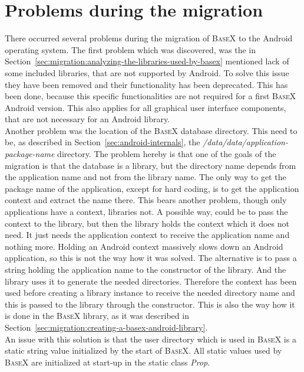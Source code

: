 \section{Problems during the migration}
\label{sec:migration:problems-during-the-migration}
There occurred several problems during the migration of \textsc{BaseX} to the Android operating system.
The first problem which was discovered, was the in Section~\ref{sec:migration:analyzing-the-libraries-used-by-basex} mentioned lack of some included libraries, that are not supported by Android.
To solve this issue they have been removed and their functionality has been deprecated.
This has been done, because this specific functionalities are not required for a first \textsc{BaseX} Android version.
This also applies for all graphical user interface components, that are not necessary for an Android library.\\
Another problem was the location of the \textsc{BaseX} database directory.
This need to be, as described in Section~\ref{sec:android-internals}, the \textit{/data/data/application-package-name} directory.
The problem hereby is that one of the goals of the migration is that the database is a library, but the directory name depends from the application name and not from the library name.
The only way to get the package name of the application, except for hard coding, is to get the application context and extract the name there.
This bears another problem, though only applications have a context, libraries not. 
A possible way, could be to pass the context to the library, but then the library holds the context which it does not need.
It just needs the application context to receive the application name and nothing more.
Holding an Android context massively slows down an Android application, so this is not the way how it was solved.
The alternative is to pass a string holding the application name to the constructor of the library.
And the library uses it to generate the needed directories.
Therefore the context has been used before creating a library instance to receive the needed directory name and this is passed to the library through the constructor.
This is also the way how it is done in the \textsc{BaseX} library, as it was described in Section~\ref{sec:migration:creating-a-basex-android-library}.\\
An issue with this solution is that the user directory which is used in \textsc{BaseX} is a static string value initialized by the start of \textsc{BaseX}.
All static values used by \textsc{BaseX} are initialized at start-up in the static class \textit{Prop}.
